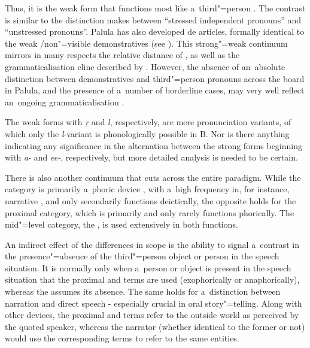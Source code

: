 Thus, it is the weak form that functions most like a~third"=person . The contrast is similar to the distinction \citet[417--419]{givon2001a} makes between ``stressed independent pronouns'' and ``unstressed  pronouns''. Palula has also developed de articles, formally identical to the  weak /non"=visible demonstratives (see ). This strong"=weak continuum mirrors in many respects the relative  distance of \citet[419]{givon2001a}, as well as the grammaticalisation cline described by \citet[432]{diessel2006}. However, the absence of an~absolute distinction between demonstratives and third"=person pronouns across the board in Palula, and the presence of a~number of borderline cases, may very well reflect an~ongoing grammaticalisation \citep[213]{himmelmann1996}.


The weak  forms with \textit{ṛ} and \textit{l}, respectively, are mere pronunciation variants, of which only the \textit{l}-variant is phonologically possible in B. Nor is there anything indicating any significance in the alternation between the strong  forms beginning with \textit{a-} and \textit{ee-}, respectively, but more detailed analysis is needed to be certain.



There is also another continuum that cuts across the entire paradigm. While the  category is primarily a~phoric device \citep[131]{saxena2006}, with a~high frequency in, for instance, narrative , and only secondarily functions deictically, the opposite holds for the proximal category, which is primarily  and only rarely functions phorically. The mid"=level category, the , is used extensively in both functions. 



An indirect effect of the differences in  scope is the ability to signal a~contrast in the presence"=absence of the third"=person object or person in the speech situation. It is normally only when a~person or object is present in the speech situation that the proximal and  terms are used (exophorically or anaphorically), whereas the  assumes its absence. The same holds for a~distinction between narration and direct speech - especially crucial in oral story"=telling. Along with other  devices, the proximal and  terms refer to the outside world as perceived by the quoted speaker, whereas the narrator (whether identical to the former or not) would use the corresponding  terms to refer to the same entities.




